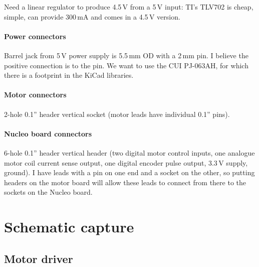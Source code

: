 \documentclass[a4paper,11pt,article]{memoir}
\begin{document}
Need a linear regulator to produce 4.5\,V from a 5\,V input: TI's
TLV702 is cheap, simple, can provide 300\,mA and comes in a 4.5\,V
version.

\paragraph{Power connectors}

Barrel jack from 5\,V power supply is 5.5\,mm OD with a 2\,mm pin. I
believe the positive connection is to the pin. We want to use the CUI
PJ-063AH, for which there is a footprint in the KiCad libraries.

\paragraph{Motor connectors}

2-hole 0.1'' header vertical socket (motor leads have individual 0.1''
pins).

\paragraph{Nucleo board connectors}

6-hole 0.1'' header vertical header (two digital motor control inputs,
one analogue motor coil current sense output, one digital encoder
pulse output, 3.3\,V supply, ground). I have leads with a pin on one
end and a socket on the other, so putting headers on the motor board
will allow these leads to connect from there to the sockets on the
Nucleo board.


\section{Schematic capture}

\subsection{Motor driver}
\end{document}
